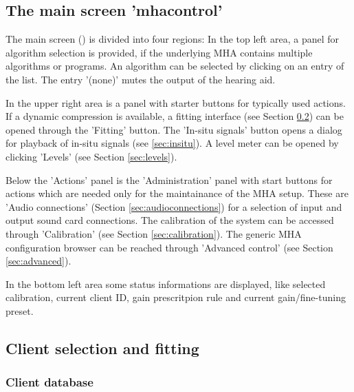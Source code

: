 \documentclass[11pt,a4paper,twoside]{article}
\begin{document}
\subsection{The main screen 'mhacontrol'}

The main screen () is divided into four regions:
%
In the top left area, a panel for algorithm selection is provided, if the underlying
MHA contains multiple algorithms or programs.
%
An algorithm can
be selected by clicking on an entry of the list.
%
The entry '(none)' mutes the output of the hearing aid.

In the upper right area is a panel with starter buttons for typically
used actions.
%
If a dynamic compression is available, a fitting interface (see
Section \ref{sec:fitting}) can be opened through the 'Fitting' button.
%
The 'In-situ signals' button opens a dialog for playback of in-situ
signals (see \ref{sec:insitu}).
%
A level meter can be opened by clicking 'Levels' (see Section
\ref{sec:levels}).

Below the 'Actions' panel is the 'Administration'
panel with start buttons for actions which are
needed only for the maintainance of the MHA setup.
%
These are 'Audio connections' (Section \ref{sec:audioconnections}) for
a selection of input and output sound card connections.
%
The calibration of the system can be accessed through 'Calibration'
(see Section \ref{sec:calibration}).
%
The generic MHA configuration browser can be reached through 'Advanced
control' (see Section \ref{sec:advanced}).

In the bottom left area some status informations are displayed, like selected
calibration, current client ID,
gain prescritpion rule and current gain/fine-tuning
preset.


\subsection{Client selection and fitting}\label{sec:fitting}

\subsubsection*{Client database}
\end{document}
